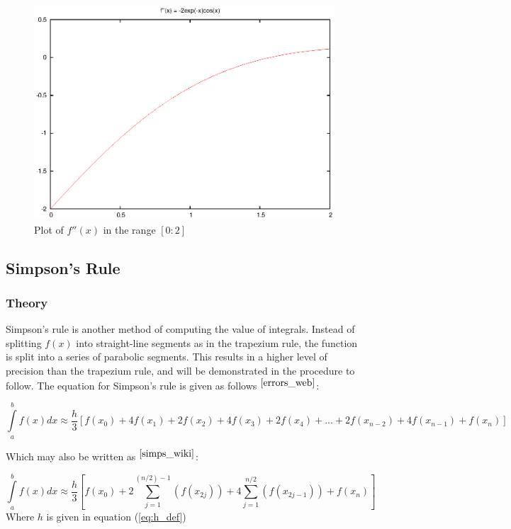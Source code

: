 \documentclass[pdf,color]{UoBnote}
\begin{document}
				
				\begin{figure}[tb]
					\centering
						\includegraphics{figures/q2-f2x-trap.eps}
					\caption{Plot of $f''(x)$ in the range $[0:2]$}
					\label{fig:q2-f2x-trap}
				\end{figure}
				
				
			
		\subsection{Simpson's Rule}
			\subsubsection{Theory}
				Simpson's rule is another method of computing the value of integrals. Instead of splitting $f(x)$ into straight-line segments as in the trapezium rule, the function is split into a
				series of parabolic segments. This results in a higher level of precision than the trapezium rule, and will be demonstrated in the procedure to follow. The equation for Simpson's rule is given as follows $^{\cite{errors_web}}$:
				
				\begin{equation} \label{simpsons}
					\int\limits_a^b f(x) dx \approx \frac{h}{3}\left[f(x_0) + 4f(x_1) + 2f(x_2) + 4f(x_3) + 2f(x_4) + ... + 2f(x_{n-2}) + 4f(x_{n-1}) +f(x_n)\right]
				\end{equation}
				
				Which may also be written as $^{\cite{simps_wiki}}$:
				
				
				\begin{equation} \label{simpsons_sum}
					\int\limits_a^b f(x) dx \approx \frac{h}{3}\left[f(x_0) + 2 \sum\limits_{j=1}^{(n/2)-1} \left(f(x_{2j})\right) + 4 \sum\limits_{j=1}^{n/2} \left(f(x_{2j-1})\right) + f(x_n) \right]
				\end{equation}
				Where $h$ is given in equation (\ref{eq:h_def})
				
\end{document}
